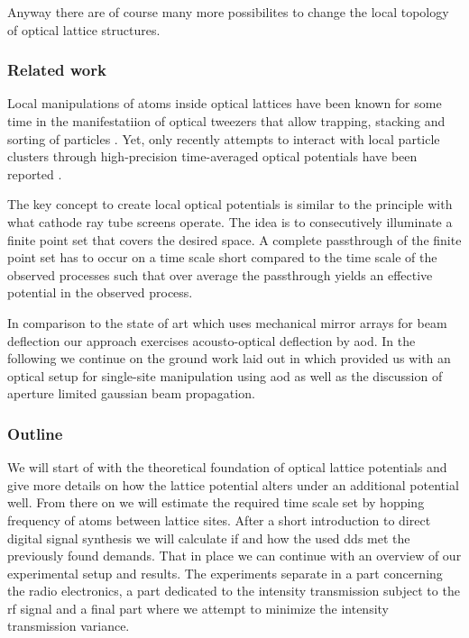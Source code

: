 Anyway there are of course many more possibilites to change the local
topology of optical lattice structures.

\subsubsection{Related work}

Local manipulations of atoms inside optical lattices have been known for some
time in the manifestatiion of optical tweezers that allow trapping, stacking
and sorting of particles \cite{Tadmor2004}. Yet, only recently attempts to
interact with local particle clusters through high-precision time-averaged
optical potentials have been reported \cite{Roy2016}.

The key concept to create local optical potentials is similar to the
principle with what cathode ray tube screens operate. The idea is to
consecutively illuminate a finite point set that covers the desired space.
A complete passthrough of the finite point set has to occur on a time scale
short compared to the time scale of the observed processes such that over
average the passthrough yields an effective potential in the observed
process.

In comparison to the state of art which uses mechanical mirror arrays for
beam deflection \cite{Roy2016} our approach exercises acousto-optical
deflection by \gls{aod}. In the following we continue on the ground work
laid out in \cite{Hertlein2017} which provided us with an optical setup for
single-site manipulation using \gls{aod} as well as the discussion of
aperture limited gaussian beam propagation.

\subsubsection{Outline}

We will start of with the theoretical foundation of optical lattice
potentials and give more details on how the lattice potential alters under
an additional potential well. From there on we will estimate the required
time scale set by hopping frequency of atoms between lattice sites. After
a short introduction to direct digital signal synthesis we will calculate
if and how the used \gls{dds} met the previously found demands. That in place
we can continue with an overview of our experimental setup and results. The
experiments separate in a part concerning the radio electronics, a part
dedicated to the intensity transmission subject to the \gls{rf} signal and
a final part where we attempt to minimize the intensity transmission
variance.
